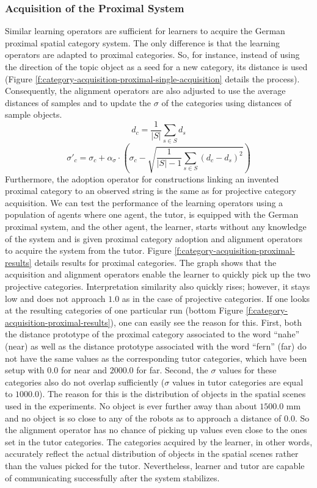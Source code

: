 \subsubsection*{Acquisition of the Proximal System}
Similar learning operators are sufficient for learners to acquire the 
German proximal spatial category system. The only difference is 
that the learning operators are adapted to proximal categories. So, for instance,
instead of using the direction of the topic object as a seed for a new category,
its distance is used (Figure \ref{f:category-acquisition-proximal-single-acquisition} 
details the process). Consequently, the alignment operators are also 
adjusted to use the average distances of samples and to 
update the $\sigma$ of the categories using distances of sample objects. 
\begin{equation}
d_c = \frac{1}{|S|}\sum_{s\in S} d_s
\label{e:update-d}
\end{equation} 
\begin{equation}
\sigma'_c = \sigma_c + \alpha_\sigma \cdot \left(\sigma_c - \sqrt{\frac{1}{|S|-1}\sum_{s\in S}(d_c - d_s)^2}\right)
\label{e:update-sigma-d}
\end{equation} 
Furthermore, the adoption operator for constructions linking an invented proximal category to 
an observed string is the same as for projective category acquisition.
We can test the performance of the learning 
operators using a population of agents where one agent, the tutor, 
is equipped with the German proximal system, and the other agent, 
the learner, starts without any knowledge 
of the system and is given proximal category adoption and alignment
operators to acquire the system from the tutor. Figure \ref{f:category-acquisition-proximal-results}
details results for proximal categories. The graph shows that 
the acquisition and alignment operators enable the learner to quickly pick up the
two projective categories. Interpretation similarity also quickly rises; however,
it stays low and does not approach $1.0$ as in the case of projective categories. 
If one looks at the resulting categories of one particular run 
(bottom Figure \ref{f:category-acquisition-proximal-results}), 
one can easily see the reason for this. First, both the distance prototype of the proximal category 
associated to the word ``nahe'' (near) as well as the distance prototype associated with the word 
``fern'' (far) do not have the same values as the corresponding tutor categories, which have been
setup with $0.0$ for near and $2000.0$ for far. Second, the $\sigma$ values for these categories also
do not overlap sufficiently ($\sigma$ values in tutor categories are equal to $1000.0$). 
The reason for this is the distribution of objects in the spatial scenes used in the experiments. 
No object is ever further away than about $1500.0$ mm and no object is so close to any of the robots as to approach
a distance of $0.0$. So the alignment operator has no chance of picking up values even close
to the ones set in the tutor categories. The categories acquired by the learner, in other words,
accurately reflect the actual distribution of objects in the spatial scenes rather than the 
values picked for the tutor. Nevertheless, learner and tutor are capable of 
communicating successfully after the system stabilizes.


